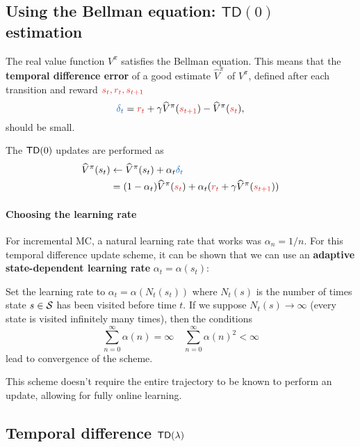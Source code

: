 \documentclass[../course-notes.tex]{subfiles}
\begin{document}
\subsection{Using the Bellman equation: $\mathsf{TD}(0)$ estimation}

The real value function $V^\pi$ satisfies the Bellman equation. This means that the \textbf{\bluefont temporal difference error} of a good estimate $\widehat{V}^\pi$ of $V^\pi$, defined after each transition and reward ${\redfont s_t,r_t,s_{t+1}}$
\begin{equation}\label{eq:ValueTDerror}
	{\bluefont\delta_t} = {\redfont r_t} + \gamma \widehat{V}^\pi({\redfont s_{t+1}}) - \widehat{V}^\pi({\redfont s_t}),
\end{equation}
should be small.

The $\mathsf{TD}(0)$ updates are performed as
\begin{align*}
	\widehat{V}^\pi(s_t) &\leftarrow
	\widehat{V}^\pi(s_t) + \alpha_t {\bluefont \delta_t} \\
	&= (1 - \alpha_t)\widehat{V}^\pi({\redfont s_t}) + \alpha_t ({\redfont r_t} + \gamma \widehat{V}^\pi({\redfont s_{t+1}}))
\end{align*}

\paragraph{Choosing the learning rate} For incremental MC, a natural learning rate that works was $\alpha_n = 1/n$. For this temporal difference update scheme, it can be shown that we can use an \textbf{adaptive state-dependent learning rate} $\alpha_t = \alpha(s_t)$:
\begin{prop}\label{prop:ValueTD0learningRate}
	Set the learning rate to $\alpha_t = \alpha(N_t(s_t))$ where $N_t(s)$ is the number of times state $s\in\mathcal{S}$ has been visited before time $t$. If we suppose $N_t(s) \to \infty$ (every state is visited infinitely many times), then the conditions
	\begin{equation}
	\sum_{n=0}^{\infty} \alpha(n) = \infty \quad
	\sum_{n=0}^{\infty} \alpha(n)^2 < \infty
	\end{equation}
	lead to convergence of the scheme.
\end{prop}

This scheme doesn't require the entire trajectory to be known to perform an update, allowing for fully online learning.



\subsection{Temporal difference $\mathsf{TD}(\lambda)$}
\end{document}
